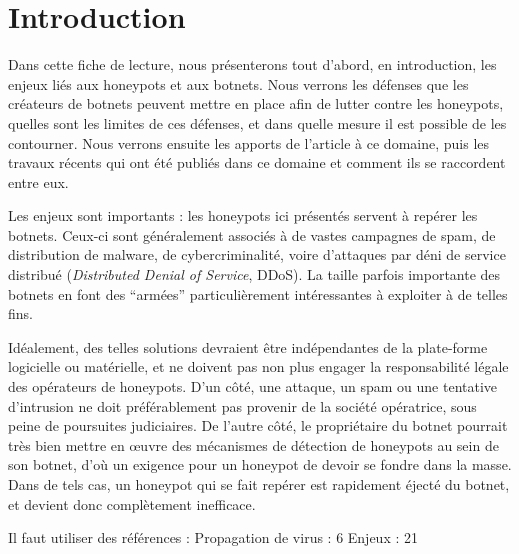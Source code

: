 \chapter*{Introduction}


Dans cette fiche de lecture, nous présenterons tout d'abord, en introduction, les enjeux liés aux honeypots et aux
botnets. Nous verrons les défenses que les créateurs de botnets peuvent mettre en place afin
de lutter contre les honeypots, quelles sont les limites de ces défenses, et dans quelle mesure il est possible 
de les contourner. Nous verrons ensuite les apports de l'article à ce domaine, puis les travaux récents
qui ont été publiés dans ce domaine et comment ils se raccordent entre eux.

Les enjeux sont importants : les honeypots ici présentés servent à repérer les botnets.  Ceux-ci sont généralement associés à de vastes campagnes de spam, de distribution de malware, de cybercriminalité, voire d'attaques par déni de service distribué (\textit{Distributed Denial of Service}, DDoS).  La taille parfois importante des botnets en font des ``armées'' particulièrement intéressantes à exploiter à de telles fins.

Idéalement, des telles solutions devraient être indépendantes de la plate-forme logicielle ou matérielle, et ne doivent pas non plus engager la responsabilité légale des opérateurs de honeypots.  D'un côté, une attaque, un spam ou une tentative d'intrusion ne doit préférablement pas provenir de la société opératrice, sous peine de poursuites judiciaires. De l'autre côté, le propriétaire du botnet pourrait très bien mettre en œuvre des mécanismes de détection de honeypots au sein de son botnet, d'où un exigence pour un honeypot de devoir se fondre dans la masse.  Dans de tels cas, un honeypot qui se fait repérer est rapidement éjecté du botnet, et devient donc complètement inefficace.


Il faut utiliser des références :
Propagation de virus : 6
Enjeux : 21
